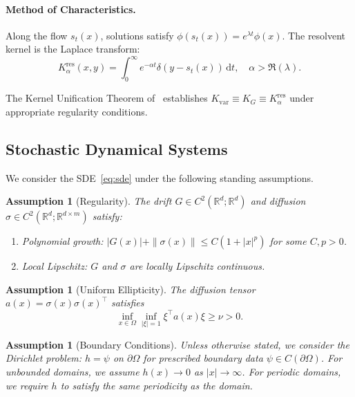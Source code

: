 \documentclass[11pt,a4paper]{article}
\newtheorem{assumption}[theorem]{Assumption}
\newcommand{\R}{\mathbb{R}}
\newcommand{\dt}{\,\mathrm{d}t}
\begin{document}
\paragraph{Method of Characteristics.} Along the flow $s_t(x)$, solutions satisfy $\phi(s_t(x)) = e^{\lambda t}\phi(x)$. The resolvent kernel is the Laplace transform:
\begin{equation}
K_\alpha^{\mathrm{res}}(x,y) = \int_0^\infty e^{-\alpha t} \delta(y - s_t(x)) \dt, \quad \alpha > \Re(\lambda).
\end{equation}

The Kernel Unification Theorem of~\cite{HamziOwhadiVaidya2024} establishes $K_{\mathrm{var}} \equiv K_G \equiv K_\alpha^{\mathrm{res}}$ under appropriate regularity conditions.

\subsection{Stochastic Dynamical Systems}

We consider the SDE~\eqref{eq:sde} under the following standing assumptions.

\begin{assumption}[Regularity]\label{ass:regularity}
The drift $G \in C^2(\R^d; \R^d)$ and diffusion $\sigma \in C^2(\R^d; \R^{d \times m})$ satisfy:
\begin{enumerate}
\item Polynomial growth: $|G(x)| + \|\sigma(x)\| \leq C(1 + |x|^p)$ for some $C, p > 0$.
\item Local Lipschitz: $G$ and $\sigma$ are locally Lipschitz continuous.
\end{enumerate}
\end{assumption}

\begin{assumption}[Uniform Ellipticity]\label{ass:ellipticity}
The diffusion tensor $a(x) = \sigma(x)\sigma(x)^\top$ satisfies
\begin{equation}
\inf_{x \in \Omega} \inf_{|\xi|=1} \xi^\top a(x) \xi \geq \nu > 0.
\end{equation}
\end{assumption}

\begin{assumption}[Boundary Conditions]\label{ass:boundary}
Unless otherwise stated, we consider the Dirichlet problem: $h = \psi$ on $\partial\Omega$ for prescribed boundary data $\psi \in C(\partial\Omega)$. For unbounded domains, we assume $h(x) \to 0$ as $|x| \to \infty$. For periodic domains, we require $h$ to satisfy the same periodicity as the domain.
\end{assumption}
\end{document}
